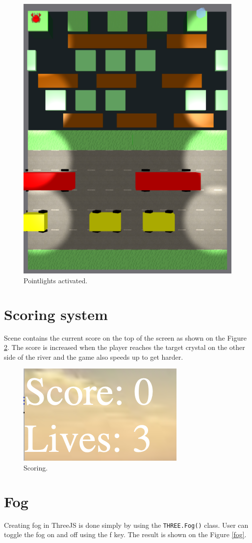 \documentclass[a4paper,10pt, twocolumn]{article}
\begin{document}
\begin{figure}[!htb]
	\centering
 	\includegraphics[width=0.7\linewidth]{images/pointlights.png}
  	\caption{Pointlights activated.}
	\label{pointlights}
\end{figure}

\section{Scoring system}
Scene contains the current score on the top of the screen as shown on the Figure \ref{score}. The score is increased when the player reaches the target crystal on the other side of the river and the game also speeds up to get harder.

\begin{figure}[!htb]
	\centering
 	\includegraphics[width=0.5\linewidth]{images/score.png}
  	\caption{Scoring.}
	\label{score}
\end{figure}


\section{Fog}
Creating fog in ThreeJS is done simply by using the \lstinline{THREE.Fog()} class. User can toggle the fog on and off using the f key. The result is shown on the Figure \ref{fog}.
\end{document}
